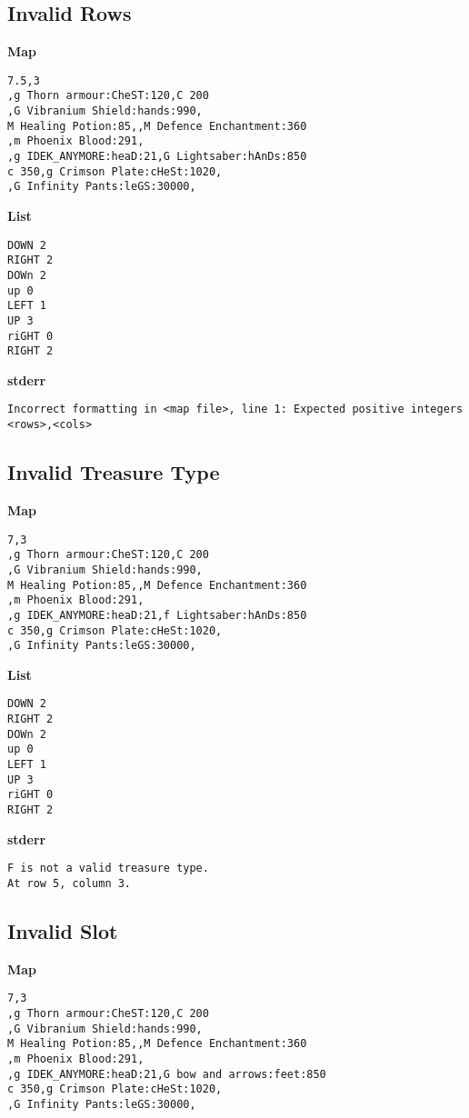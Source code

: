 \documentclass{article}
\begin{document}
\subsection{Invalid Rows}

\quad \textbf{Map}
\begin{lstlisting}
7.5,3
,g Thorn armour:CheST:120,C 200
,G Vibranium Shield:hands:990,
M Healing Potion:85,,M Defence Enchantment:360
,m Phoenix Blood:291,
,g IDEK_ANYMORE:heaD:21,G Lightsaber:hAnDs:850
c 350,g Crimson Plate:cHeSt:1020,
,G Infinity Pants:leGS:30000,
\end{lstlisting}

\textbf{List}
\begin{lstlisting}
DOWN 2
RIGHT 2
DOWn 2
up 0
LEFT 1
UP 3
riGHT 0
RIGHT 2
\end{lstlisting}
\pagebreak

\textbf{stderr}
\begin{lstlisting}
Incorrect formatting in <map file>, line 1: Expected positive integers <rows>,<cols>
\end{lstlisting}

\subsection{Invalid Treasure Type}

\quad \textbf{Map}
\begin{lstlisting}
7,3
,g Thorn armour:CheST:120,C 200
,G Vibranium Shield:hands:990,
M Healing Potion:85,,M Defence Enchantment:360
,m Phoenix Blood:291,
,g IDEK_ANYMORE:heaD:21,f Lightsaber:hAnDs:850
c 350,g Crimson Plate:cHeSt:1020,
,G Infinity Pants:leGS:30000,
\end{lstlisting}

\textbf{List}
\begin{lstlisting}
DOWN 2
RIGHT 2
DOWn 2
up 0
LEFT 1
UP 3
riGHT 0
RIGHT 2
\end{lstlisting}
\pagebreak

\textbf{stderr}
\begin{lstlisting}
F is not a valid treasure type.
At row 5, column 3.
\end{lstlisting}

\subsection{Invalid Slot}

\quad \textbf{Map}
\begin{lstlisting}
7,3
,g Thorn armour:CheST:120,C 200
,G Vibranium Shield:hands:990,
M Healing Potion:85,,M Defence Enchantment:360
,m Phoenix Blood:291,
,g IDEK_ANYMORE:heaD:21,G bow and arrows:feet:850
c 350,g Crimson Plate:cHeSt:1020,
,G Infinity Pants:leGS:30000,
\end{lstlisting}
\end{document}
